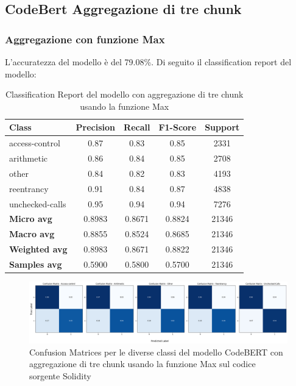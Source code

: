 \documentclass[../../Thesis.tex]{subfiles}
\begin{document}
    
\subsection{CodeBert Aggregazione di tre chunk}
\subsubsection{Aggregazione con funzione Max}
L'accuratezza del modello è del 79.08\%. Di seguito il classification report del modello:
\begin{table}[H]
    \centering
    \small
    \begin{tabular}{lcccc}
    \hline
    \textbf{Class} & \textbf{Precision} & \textbf{Recall} & \textbf{F1-Score} & \textbf{Support} \\
    \hline
    access-control & 0.87 & 0.83 & 0.85 & 2331 \\
    arithmetic & 0.86 & 0.84 & 0.85 & 2708 \\
    other & 0.84 & 0.82 & 0.83 & 4193 \\
    reentrancy & 0.91 & 0.84 & 0.87 & 4838 \\
    unchecked-calls & 0.95 & 0.94 & 0.94 & 7276 \\
    \hline
    \textbf{Micro avg} & 0.8983 & 0.8671 & 0.8824 & 21346 \\
    \textbf{Macro avg} & 0.8855 & 0.8524 & 0.8685 & 21346 \\
    \textbf{Weighted avg} & 0.8983 & 0.8671 & 0.8822 & 21346 \\
    \textbf{Samples avg} & 0.5900 & 0.5800 & 0.5700 & 21346 \\
    \hline
    \end{tabular}
    \caption{Classification Report del modello con aggregazione di tre chunk usando la funzione Max}
    \end{table}

    \begin{figure}[H]
        \includegraphics[width=1.05\textwidth]{../../img/CFMax3-SC.png}
        \caption{Confusion Matrices per le diverse classi del modello CodeBERT con aggregazione di tre chunk usando la funzione Max sul codice sorgente Solidity}
    \end{figure}
    
\end{document}
